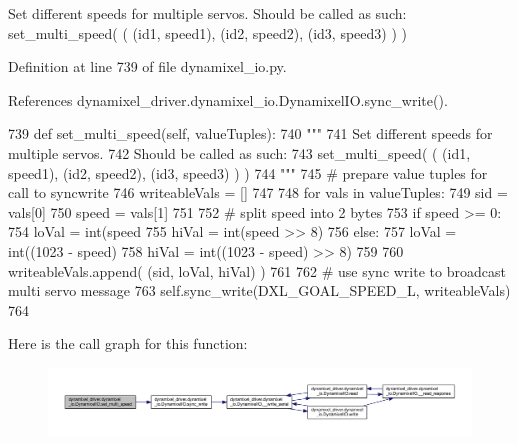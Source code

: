 \begin{DoxyVerb}Set different speeds for multiple servos.
Should be called as such:
set_multi_speed( ( (id1, speed1), (id2, speed2), (id3, speed3) ) )
\end{DoxyVerb}
 

Definition at line 739 of file dynamixel\+\_\+io.\+py.



References dynamixel\+\_\+driver.\+dynamixel\+\_\+io.\+Dynamixel\+I\+O.\+sync\+\_\+write().


\begin{DoxyCode}
739     \textcolor{keyword}{def }set\_multi\_speed(self, valueTuples):
740         \textcolor{stringliteral}{"""}
741 \textcolor{stringliteral}{        Set different speeds for multiple servos.}
742 \textcolor{stringliteral}{        Should be called as such:}
743 \textcolor{stringliteral}{        set\_multi\_speed( ( (id1, speed1), (id2, speed2), (id3, speed3) ) )}
744 \textcolor{stringliteral}{        """}
745         \textcolor{comment}{# prepare value tuples for call to syncwrite}
746         writeableVals = []
747 
748         \textcolor{keywordflow}{for} vals \textcolor{keywordflow}{in} valueTuples:
749             sid = vals[0]
750             speed = vals[1]
751 
752             \textcolor{comment}{# split speed into 2 bytes}
753             \textcolor{keywordflow}{if} speed >= 0:
754                 loVal = int(speed %
755                 hiVal = int(speed >> 8)
756             \textcolor{keywordflow}{else}:
757                 loVal = int((1023 - speed) %
758                 hiVal = int((1023 - speed) >> 8)
759 
760             writeableVals.append( (sid, loVal, hiVal) )
761 
762         \textcolor{comment}{# use sync write to broadcast multi servo message}
763         self.sync\_write(DXL\_GOAL\_SPEED\_L, writeableVals)
764 
\end{DoxyCode}
Here is the call graph for this function\+:
\nopagebreak
\begin{figure}[H]
\begin{center}
\leavevmode
\includegraphics[width=350pt]{dd/d77/classdynamixel__driver_1_1dynamixel__io_1_1_dynamixel_i_o_a8150f8a015df1441f348eb0a6c6ccaee_cgraph}
\end{center}
\end{figure}
\mbox{\label{classdynamixel__driver_1_1dynamixel__io_1_1_dynamixel_i_o_a131a8a5ce4168f260e0661c2867155d2}} 
